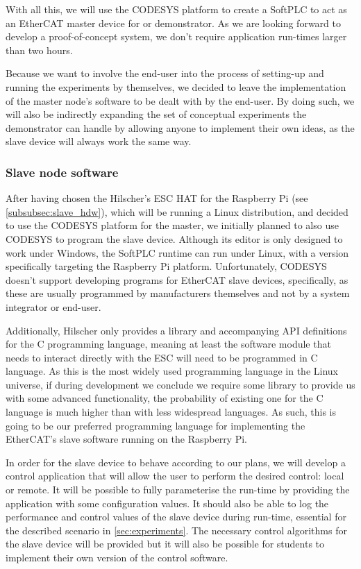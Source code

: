 With all this, we will use the CODESYS platform to create a SoftPLC to act as an EtherCAT master device for or demonstrator.
As we are looking forward to develop a proof-of-concept system, we don't require application run-times larger than two hours.

Because we want to involve the end-user into the process of setting-up and running the experiments by themselves, we decided to leave the implementation of the master node's software to be dealt with by the end-user.
By doing such, we will also be indirectly expanding the set of conceptual experiments the demonstrator can handle by allowing anyone to implement their own ideas, as the slave device will always work the same way.

\subsubsection{Slave node software}

After having chosen the Hilscher's ESC HAT for the Raspberry Pi (see \autoref{subsubsec:slave_hdw}), which will be running a Linux distribution, and decided to use the CODESYS platform for the master, we initially planned to also use CODESYS to program the slave device.
Although its editor is only designed to work under Windows, the SoftPLC runtime can run under Linux, with a version specifically targeting the Raspberry Pi platform.
Unfortunately, CODESYS doesn't support developing programs for EtherCAT slave devices, specifically, as these are usually programmed by manufacturers themselves and not by a system integrator or end-user.

Additionally, Hilscher only provides a library and accompanying API definitions for the C programming language, meaning at least the software module that needs to interact directly with the ESC will need to be programmed in C language.
As this is the most widely used programming language in the Linux universe, if during development we conclude we require some library to provide us with some advanced functionality, the probability of existing one for the C language is much higher than with less widespread languages.
As such, this is going to be our preferred programming language for implementing the EtherCAT's slave software running on the Raspberry Pi.

In order for the slave device to behave according to our plans, we will develop a control application that will allow the user to perform the desired control: local or remote.
It will be possible to fully parameterise the run-time by providing the application with some configuration values.
It should also be able to log the performance and control values of the slave device during run-time, essential for the described scenario in \autoref{sec:experiments}.
The necessary control algorithms for the slave device will be provided but it will also be possible for students to implement their own version of the control software.
